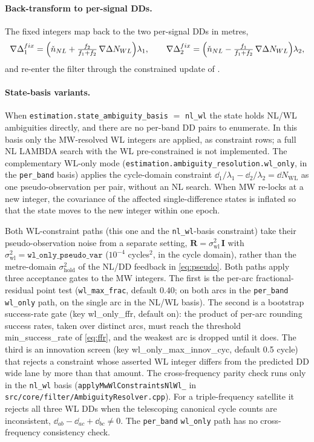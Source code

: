 \documentclass[main.tex]{subfiles}
\begin{document}
\paragraph{Back-transform to per-signal DDs.}
The fixed integers map back to the two per-signal DDs in metres,
\begin{equation}
\nabla\Delta_1^{fix}
  = \Bigl(\check{n}_{NL}
    + \tfrac{f_2}{f_1+f_2}\,\nabla\Delta N_{WL}\Bigr)\lambda_1,
\qquad
\nabla\Delta_2^{fix}
  = \Bigl(\check{n}_{NL}
    - \tfrac{f_1}{f_1+f_2}\,\nabla\Delta N_{WL}\Bigr)\lambda_2,
\label{eq:nl-back}
\end{equation}
and re-enter the filter through the constrained update of
.

\paragraph{State-basis variants.}
When \texttt{estimation.state\_ambiguity\_basis} $=$ \texttt{nl\_wl} the
state holds NL/WL ambiguities directly, and there are no per-band DD
pairs to enumerate.  In this basis only the MW-resolved WL integers are
applied, as constraint rows; a full NL \textsc{LAMBDA} search with the
WL pre-constrained is not implemented.  The complementary WL-only mode
(\texttt{estimation.ambiguity\_resolution.wl\_only}, in the
\texttt{per\_band} basis) applies the cycle-domain constraint
$\dd{}_{1}/\lambda_1 - \dd{}_{2}/\lambda_2 = \dd N_{\mathrm{WL}}$ as one
pseudo-observation per pair, without an NL search.  When MW re-locks at
a new integer, the covariance of the affected single-difference states
is inflated so that the state moves to the new integer within one epoch.

Both WL-constraint paths (this one and the \texttt{nl\_wl}-basis
constraint) take their pseudo-observation noise from a separate
setting, $\bm{R} = \sigma^2_{\mathrm{wl}}\,\bm{I}$ with
$\sigma^2_{\mathrm{wl}} = \texttt{wl\_only\_pseudo\_var}$ ($10^{-4}$
cycles$^2$, in the cycle domain), rather than the metre-domain
$\sigma^2_{\mathrm{hold}}$ of the NL/DD feedback in \eqref{eq:pseudo}.
Both paths apply three acceptance gates to the MW integers.  The first
is the per-arc fractional-residual point test (\texttt{wl\_max\_frac},
default $0.40$; on both arcs in the \texttt{per\_band} \texttt{wl\_only}
path, on the single arc in the NL/WL basis).  The second is a bootstrap
success-rate gate (key wl\_only\_ffr, default on): the product of
per-arc rounding success rates, taken over distinct arcs, must reach the
threshold min\_success\_rate of \eqref{eq:ffr}, and the weakest
arc is dropped until it does.  The third is an innovation screen (key
wl\_only\_max\_innov\_cyc, default 0.5 cycle) that rejects a constraint
whose asserted WL integer differs from the predicted DD wide lane by
more than that amount.  The cross-frequency parity check runs only in
the \texttt{nl\_wl} basis (\texttt{applyMwWlConstraintsNlWl\_} in
\texttt{src/core/filter/AmbiguityResolver.cpp}).  For a
triple-frequency satellite it rejects all three WL DDs when the
telescoping canonical cycle counts are inconsistent,
$\dd{}_{ab} - \dd{}_{ac} + \dd{}_{bc} \ne 0$.  The \texttt{per\_band}
\texttt{wl\_only} path has no cross-frequency consistency check.
\end{document}
